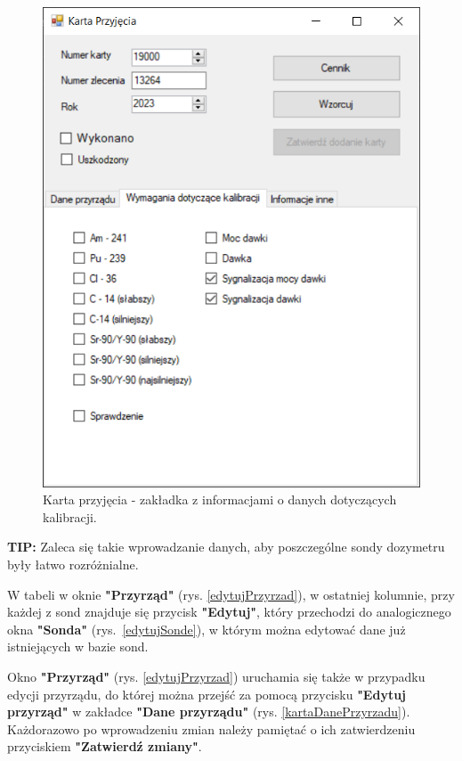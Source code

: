 \begin{figure}[htb]
	\centering
	\includegraphics{obrazki/Biuro/karta/karta_dane_wymagania.png}
	\caption{Karta przyjęcia - zakładka z informacjami o danych dotyczących kalibracji.}
	\label{kartaDaneKalibracji}
\end{figure}

\textbf{TIP:} Zaleca się takie wprowadzanie danych, aby poszczególne sondy dozymetru były łatwo rozróżnialne.

W tabeli w oknie \textbf{"Przyrząd"} (rys. \ref{edytujPrzyrzad}), w ostatniej kolumnie, przy każdej z sond znajduje się przycisk \textbf{"Edytuj"}, który przechodzi do analogicznego okna \textbf{"Sonda"} (rys.~\ref{edytujSonde}), w którym można edytować dane już istniejących w bazie sond. 

Okno \textbf{"Przyrząd"} (rys. \ref{edytujPrzyrzad}) uruchamia się także w przypadku edycji przyrządu, do której można przejść za pomocą przycisku \textbf{"Edytuj przyrząd"} w zakładce \textbf{"Dane przyrządu"} (rys. \ref{kartaDanePrzyrzadu}). Każdorazowo po wprowadzeniu zmian należy pamiętać o ich zatwierdzeniu przyciskiem \textbf{"Zatwierdź zmiany"}.
 
